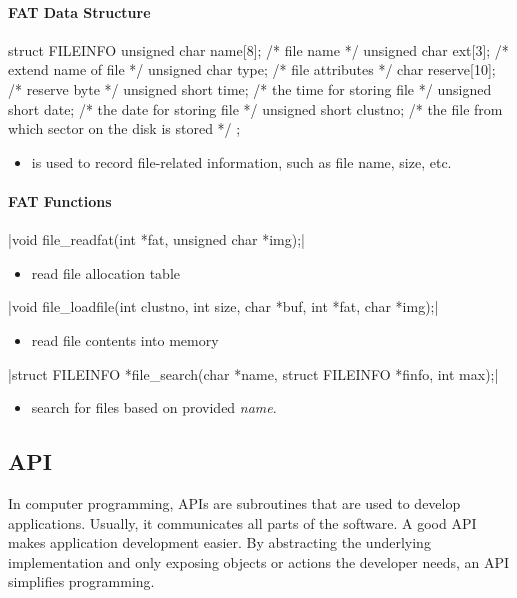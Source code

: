 \documentclass{swfcthesis}
\begin{document}
\paragraph{FAT Data Structure}

\begin{codeblock}[1]
\begin{ccode}
struct FILEINFO
{ 
  unsigned char name[8];   /* file name */
  unsigned char ext[3];    /* extend name of file */
  unsigned char type;      /* file attributes */
  char reserve[10];        /* reserve byte */
  unsigned short time;     /* the time for storing file */
  unsigned short date;     /* the date for storing file */
  unsigned short  clustno; /* the file from which sector on the disk is stored */
};
\end{ccode}
\end{codeblock}
\begin{itemize}
\item is used to record file-related information, such as file name, size, etc.
\end{itemize}

\paragraph{FAT Functions}

\csingle|void file_readfat(int *fat, unsigned char *img);|
\begin{itemize}
\item read file allocation table
\end{itemize}

\csingle|void file_loadfile(int clustno, int size, char *buf, int *fat, char *img);|
\begin{itemize}
\item read file contents into memory
\end{itemize}

\csingle|struct FILEINFO *file_search(char *name, struct FILEINFO *finfo, int max);|
\begin{itemize}
\item search for files based on provided \emph{name}.
\end{itemize}

\subsection{API}
\label{sec:api}
In computer programming, APIs are subroutines that are used to develop
applications. Usually, it communicates all parts of the software. A good API makes
application development easier. By abstracting the underlying implementation and only
exposing objects or actions the developer needs, an API simplifies programming.
\end{document}
